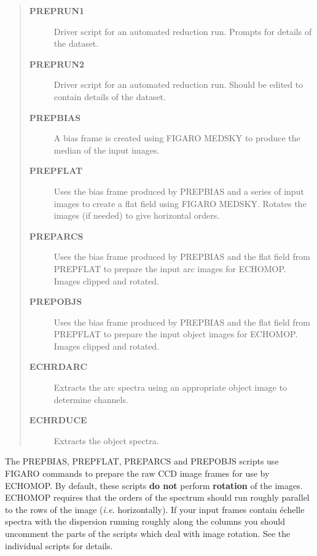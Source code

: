 \documentclass[twoside,11pt]{article}
\newcommand{\htmlref}[2]{#1}
\newcommand{\xref}[3]{#1}
\begin{document}
\begin{quote}
\begin{description}

\item [\htmlref{{\bf PREPRUN1}}{se_preprun}]
      Driver script for an automated reduction run.
      Prompts for details of the dataset.

\item [\htmlref{{\bf PREPRUN2}}{se_preprun}]
      Driver script for an automated reduction run.
      Should be edited to contain details of the dataset.

\item [\htmlref{{\bf PREPBIAS}}{se_prepbias}]
      A bias frame is created using \xref{FIGARO}{sun86}{}
      \xref{MEDSKY}{sun86}{MEDSKY} to produce the median of the input
      images.

\item [\htmlref{{\bf PREPFLAT}}{se_prepflat}]
      Uses the bias frame produced by PREPBIAS and a series
      of input images to create a flat field using FIGARO MEDSKY.
      Rotates the images (if needed) to give horizontal orders.

\item [\htmlref{{\bf PREPARCS}}{se_preparcs}]
      Uses the bias frame produced by PREPBIAS and the flat field
      from PREPFLAT to prepare the input arc images for ECHOMOP\@.
      Images clipped and rotated.

\item [\htmlref{{\bf PREPOBJS}}{se_prepobjs}]
      Uses the bias frame produced by PREPBIAS and the flat field
      from PREPFLAT to prepare the input object images for ECHOMOP\@.
      Images clipped and rotated.

\item [\htmlref{{\bf ECHRDARC}}{se_echrdarc}]
      Extracts the arc spectra using an appropriate object
      image to determine channels.

\item [\htmlref{{\bf ECHRDUCE}}{se_echrduce}]
      Extracts the object spectra.

\end{description}
\end{quote}

The PREPBIAS, PREPFLAT, PREPARCS and PREPOBJS scripts use FIGARO commands to
prepare the raw CCD image frames for use by ECHOMOP\@.
By default, these scripts {\bf do not} perform {\bf rotation} of the images.
ECHOMOP requires that the orders of the spectrum should run roughly parallel
to the rows of the image ({\it{i.e.}} horizontally).
If your input frames contain \'{e}chelle spectra with the dispersion running
roughly along the columns you should uncomment the parts of the scripts which
deal with image rotation.
See the individual scripts for details.
\end{document}

